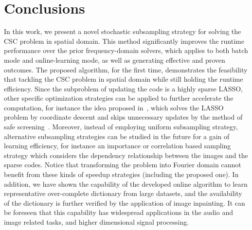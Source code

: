 \section{Conclusions}
In this work, we present a novel stochastic subsampling strategy for solving the CSC problem in spatial domain. This method significantly improves the runtime performance over the prior frequency-domain solvers, which applies to both batch mode and online-learning mode, as well as generating effective and proven outcomes. The proposed algorithm, for the first time, demonstrates the feasibility that tackling the CSC problem in spatial domain while still holding the runtime efficiency. Since the subproblem of updating the code is a highly sparse LASSO, other specific optimization strategies can be applied to further accelerate the computation, for instance the idea proposed in~\cite{johnson2017stingycd}, which solves the LASSO problem by coordinate descent and skips unnecessary updates by the method of safe screening~\cite{ghaoui2012Swfe}. Moreover, instead of employing uniform subsampling strategy, alternative subsampling strategies can be studied in the future for a gain of learning efficiency, for instance an importance or correlation based sampling strategy which considers the dependency relationship between the images and the sparse codes. Notice that transforming the problem into Fourier domain cannot benefit from these kinds of speedup strategies (including the proposed one). In addition, we have shown the capability of the developed online algorithm to learn representative over-complete dictionary from large datasets, and the availability of the dictionary is further verified by the application of image inpainting. It can be foreseen that this capability has widespread applications in the audio and image related tasks, and higher dimensional signal processing. 